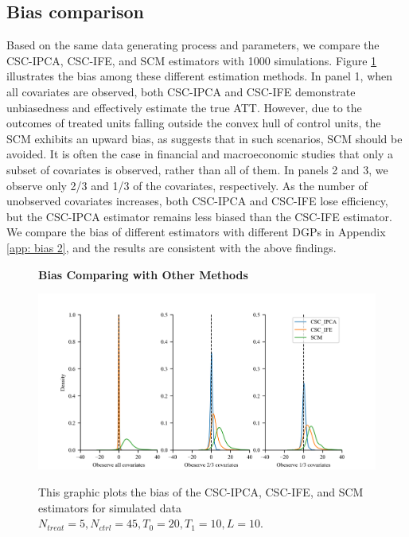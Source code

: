 \documentclass[12pt]{article}
\begin{document}
\subsection{Bias comparison}
\label{sec: bias comparing}
Based on the same data generating process and parameters, we compare the CSC-IPCA, CSC-IFE, and SCM estimators with 1000 simulations. Figure \ref{fig: bias} illustrates the bias among these different estimation methods. In panel 1, when all covariates are observed, both CSC-IPCA and CSC-IFE demonstrate unbiasedness and effectively estimate the true ATT. However, due to the outcomes of treated units falling outside the convex hull of control units, the SCM exhibits an upward bias, as \cite{abadie2010synthetic} suggests that in such scenarios, SCM should be avoided. It is often the case in financial and macroeconomic studies that only a subset of covariates is observed, rather than all of them. In panels 2 and 3, we observe only 2/3 and 1/3 of the covariates, respectively. As the number of unobserved covariates increases, both CSC-IPCA and CSC-IFE lose efficiency, but the CSC-IPCA estimator remains less biased than the CSC-IFE estimator. We compare the bias of different estimators with different DGPs in Appendix \ref{app: bias 2}, and the results are consistent with the above findings.

\begin{figure}[!ht]
\centering
\caption{\textbf{Bias Comparing with Other Methods}}
\includegraphics{figs/bias_compar1.png}
\label{fig: bias}
\caption*{\footnotesize{This graphic plots the bias of the CSC-IPCA, CSC-IFE, and SCM estimators for simulated data $N_{treat} = 5, N_{ctrl} = 45, T_0=20, T_1=10, L=10$.}}
\end{figure}
\end{document}
